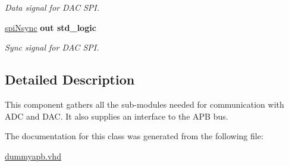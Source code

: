 \begin{DoxyCompactItemize}
\begin{DoxyCompactList}\small\item\em Data signal for D\-A\-C S\-P\-I. \end{DoxyCompactList}\item 
\hypertarget{classdummyapb_ae9d5788ea215a9d9dd1b8b43e977d582}{\hyperlink{classdummyapb_ae9d5788ea215a9d9dd1b8b43e977d582}{spi\-Nsync}  {\bfseries {\bfseries \textcolor{vhdlkeyword}{out}\textcolor{vhdlchar}{ }}} {\bfseries \textcolor{comment}{std\-\_\-logic}\textcolor{vhdlchar}{ }} }\label{classdummyapb_ae9d5788ea215a9d9dd1b8b43e977d582}

\begin{DoxyCompactList}\small\item\em Sync signal for D\-A\-C S\-P\-I. \end{DoxyCompactList}\end{DoxyCompactItemize}


\subsection{Detailed Description}
This component gathers all the sub-\/modules needed for communication with A\-D\-C and D\-A\-C. It also supplies an interface to the A\-P\-B bus. 

The documentation for this class was generated from the following file\-:\begin{DoxyCompactItemize}
\item 
\hyperlink{dummyapb_8vhd}{dummyapb.\-vhd}\end{DoxyCompactItemize}
